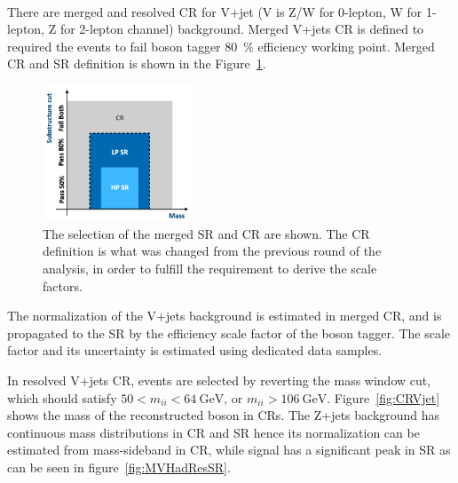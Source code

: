 \noindent\textbf{}  \\
There are merged and resolved CR for V+jet (V is Z/W for 0-lepton, W for 1-lepton, Z for 2-lepton channel) background.
Merged V+jets CR is defined to required the events to fail boson tagger 80~\% efficiency working point. 
Merged CR and SR definition is shown in the Figure~\ref{fig:MergedRegion}.
\begin{figure}[H]
    \centering
    \includegraphics[width=0.4\textwidth]{figures/MergedRegion}
    \caption{The selection of the merged SR and CR are shown. The CR definition is what was changed from the previous round of the analysis, in order to fulfill the requirement to derive the scale factors.}
    \label{fig:MergedRegion}
\end{figure}
The normalization of the V+jets background is estimated in merged CR, and is propagated to the SR by the efficiency scale factor of the boson tagger.
The scale factor and its uncertainty is estimated using dedicated data samples. 

In resolved V+jets CR, events are selected by reverting the mass window cut, which should satisfy $50<m_{i i}<64 ~\mathrm{GeV}$, or $m_{i i}>106 ~\mathrm{GeV}$. 
Figure~\ref{fig:CRVjet} shows the mass of the reconstructed boson in CRs. The Z+jets background has continuous mass distributions in CR and SR hence its normalization can be estimated from mass-sideband in CR, while signal has a significant peak in SR as can be seen in figure~\ref{fig:MVHadResSR}.

